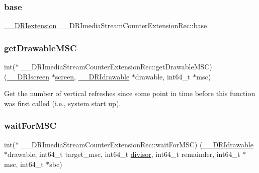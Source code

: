 \subsubsection{\texorpdfstring{base}{base}}
{\footnotesize\ttfamily \hyperlink{dri__interface_8h_a4e0a61c8ece00d2b2c6792a9a1b55385}{\+\_\+\+\_\+\+D\+R\+Iextension} \+\_\+\+\_\+\+D\+R\+Imedia\+Stream\+Counter\+Extension\+Rec\+::base}

\mbox{\label{struct_____d_r_imedia_stream_counter_extension_rec_a82d7d1aecc55e2ac74d30b5b14acce95}} 
\subsubsection{\texorpdfstring{get\+Drawable\+M\+SC}{getDrawableMSC}}
{\footnotesize\ttfamily int($\ast$ \+\_\+\+\_\+\+D\+R\+Imedia\+Stream\+Counter\+Extension\+Rec\+::get\+Drawable\+M\+SC) (\hyperlink{dri__interface_8h_a9961b01d421ee1fd6ed3c05acc9ca561}{\+\_\+\+\_\+\+D\+R\+Iscreen} $\ast$\hyperlink{cad_8h_ae04e09e4e3831bfc1632c509ae37dcec}{screen}, \hyperlink{dri__interface_8h_a5bfb832a0a08208d95b3bbef439d2262}{\+\_\+\+\_\+\+D\+R\+Idrawable} $\ast$drawable, int64\+\_\+t $\ast$msc)}

Get the number of vertical refreshes since some point in time before this function was first called (i.\+e., system start up). \mbox{\label{struct_____d_r_imedia_stream_counter_extension_rec_a107fccbb1b65855b80ad77bf18cc1f8e}} 
\subsubsection{\texorpdfstring{wait\+For\+M\+SC}{waitForMSC}}
{\footnotesize\ttfamily int($\ast$ \+\_\+\+\_\+\+D\+R\+Imedia\+Stream\+Counter\+Extension\+Rec\+::wait\+For\+M\+SC) (\hyperlink{dri__interface_8h_a5bfb832a0a08208d95b3bbef439d2262}{\+\_\+\+\_\+\+D\+R\+Idrawable} $\ast$drawable, int64\+\_\+t target\+\_\+msc, int64\+\_\+t \hyperlink{glcorearb_8h_a8663d897b5393d6facc1df40530f841d}{divisor}, int64\+\_\+t remainder, int64\+\_\+t $\ast$msc, int64\+\_\+t $\ast$sbc)}

